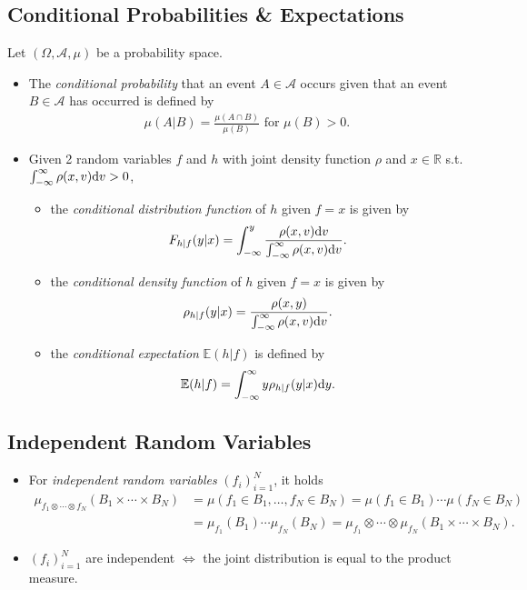 \documentclass[oneside,11pt]{book}
\numberwithin{equation}{section}
\begin{document}
\subsection{Conditional Probabilities \& Expectations}
Let $(\Omega,\mathcal{A},\mu)$ be a probability space.
\begin{itemize}
    \item The \textit{conditional probability} that an event $A\in\mathcal{A}$ occurs given that an event $B\in\mathcal{A}$ has occurred is defined by
    \begin{align*}
        \mu(A|B) = \frac{\mu(A\cap B)}{\mu(B)} \mbox{ for } \mu(B) > 0.
    \end{align*}
    \item Given 2 random variables $f$ and $h$ with joint density function $\rho$ and $x\in\mathbb{R}$ s.t. $\int_{-\infty}^\infty \rho(x,v){\rm d}v > 0$,
    \begin{itemize}
        \item the \textit{conditional distribution function} of $h$ given $f = x$ is given by
        \begin{align*}
            F_{h|f}(y|x) = \int_{-\infty}^y \frac{\rho(x,v){\rm d}v}{\int_{-\infty}^\infty \rho(x,v){\rm d}v}.
        \end{align*}
        \item the \textit{conditional density function} of $h$ given $f = x$ is given by
        \begin{align*}
            \rho_{h|f}(y|x) = \frac{\rho(x,y)}{\int_{-\infty}^\infty \rho(x,v){\rm d}v}.
        \end{align*}
        \item the \textit{conditional expectation} $\mathbb{E}(h|f)$ is defined by
        \begin{align*}
            \mathbb{E}(h|f) = \int_{-\infty}^\infty y\rho_{h|f}(y|x){\rm d}y.
        \end{align*}
    \end{itemize}
\end{itemize}

\subsection{Independent Random Variables}
\begin{itemize}
    \item For \textit{independent random variables} $(f_i)_{i=1}^N$, it holds
    \begin{align*}
        \mu_{f_1\otimes\cdots\otimes f_N}(B_1\times\cdots\times B_N) &= \mu(f_1\in B_1,\ldots,f_N\in B_N) = \mu(f_1\in B_1)\cdots\mu(f_N\in B_N)\\
        &= \mu_{f_1}(B_1)\cdots\mu_{f_N}(B_N) = \mu_{f_1}\otimes\cdots\otimes\mu_{f_N}(B_1\times\cdots\times B_N).
    \end{align*}
    \item $(f_i)_{i=1}^N$ are independent $\Leftrightarrow$ the joint distribution is equal to the product measure.
\end{itemize}
\end{document}
